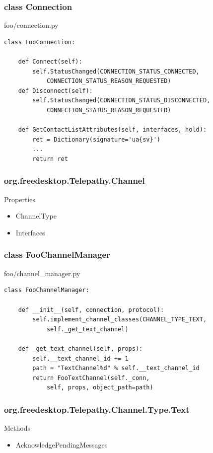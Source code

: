 \documentclass{beamer}
\begin{document}
\begin{frame}[fragile]
    \frametitle{class Connection}
    \begin{block}{foo/connection.py}
    \begin{verbatim}
class FooConnection:

    def Connect(self):
        self.StatusChanged(CONNECTION_STATUS_CONNECTED,
            CONNECTION_STATUS_REASON_REQUESTED)
    def Disconnect(self):
        self.StatusChanged(CONNECTION_STATUS_DISCONNECTED,
            CONNECTION_STATUS_REASON_REQUESTED)

    def GetContactListAttributes(self, interfaces, hold):
        ret = Dictionary(signature='ua{sv}')
        ...
        return ret
    \end{verbatim}
    \end{block}
\end{frame}

\begin{frame}[fragile]
    \frametitle{org.freedesktop.Telepathy.Channel}
    
    \begin{block}{Properties}
    \begin{itemize}
    \item ChannelType
    \item Interfaces
    \end{itemize}
    \end{block}
\end{frame}

\begin{frame}[fragile]
    \frametitle{class FooChannelManager}
    \begin{block}{foo/channel\_manager.py}
    \begin{verbatim}
class FooChannelManager:

    def __init__(self, connection, protocol):
        self.implement_channel_classes(CHANNEL_TYPE_TEXT,
            self._get_text_channel)

    def _get_text_channel(self, props):
        self.__text_channel_id += 1
        path = "TextChannel%d" % self.__text_channel_id
        return FooTextChannel(self._conn, 
            self, props, object_path=path)
    \end{verbatim}
    \end{block}
\end{frame}

\begin{frame}[fragile]
    \frametitle{org.freedesktop.Telepathy.Channel.Type.Text}

    \begin{block}{Methods}
    \begin{itemize}
    \item AcknowledgePendingMessages
    \end{itemize}
    \end{block}
\end{frame}
\end{document}
